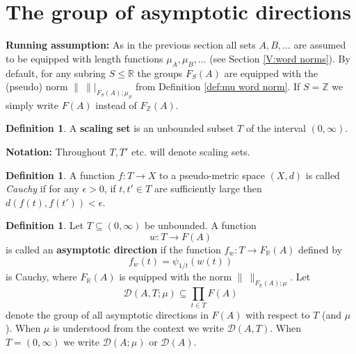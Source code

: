 \documentclass[12pt]{amsart}
\theoremstyle{definition}
\newtheorem{defn}[prop]{Definition}
\newtheorem*{notationx}{Notation}
\def\RR{\ensuremath{\mathbb{R}}}
\def\ZZ{\ensuremath{\mathbb{Z}}}
\newcommand{\C}[1]{\mathcal{#1}}
\def\Free{F}
\begin{document}
\fi
%
%











\section{The group of asymptotic directions}
\label{section:direction}

\noindent
{\bf Running assumption:}
As in the previous section all sets $A,B,\dots$ are assumed to be equipped with length functions $\mu_A,\mu_B,\dots$ (see Section \ref{V:word norms}).
By default, for any subring $S \leq \RR$ the groups $\Free_S(A)$ are equipped with the (pseudo) norm $\| \ \||_{\Free_S(A);\mu_S}$ from Definition \ref{def:mu word norm}.
If $S=\ZZ$ we simply write $\Free(A)$ instead of $\Free_\ZZ(A)$.

\medskip



\begin{defn}\label{def:scaling set}
A {\bf scaling set} is an unbounded subset $T$ of the interval $(0,\infty)$.
\end{defn}


\medskip
\noindent
{\bf Notation:}
Throughout $T,T'$ etc. will denote scaling sets.


\begin{defn}\label{D:Cauchy function}
A function $f \colon T \to X$ to a pseudo-metric space $(X,d)$ is called {\em Cauchy} if for any $\epsilon>0$, if $t,t' \in T$ are sufficiently large then $d(f(t),f(t'))<\epsilon$.
\end{defn}


\begin{defn}\label{D:DAd}
Let $T \subseteq (0,\infty)$ be unbounded.
A function 
\[
w \colon T \to F(A)
\] 
is called an {\bf asymptotic direction} if the function $f_w \colon T \to \Free_\RR(A)$ defined by
\[
f_w(t) = \psi_{1/t}(w(t))
\]
is Cauchy, where $\Free_\RR(A)$ is equipped with the norm $\| \ \|_{\Free_\RR(A);\mu}$.
Let 
\[
\C D(A,T;\mu) \subseteq \prod_{t \in T} \Free(A)
\]
denote the {group of all asymptotic directions} in $F(A)$ with respect to $T$ (and $\mu$).
When $\mu$ is understood from the context we write $\C D(A,T)$.
When $T=(0,\infty)$ we write $\C D(A;\mu)$ or $\C D(A)$.
\end{defn}
\end{document}
